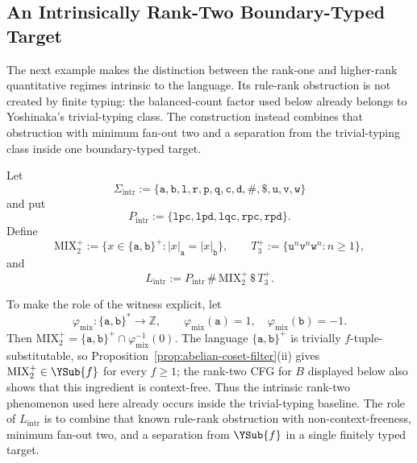 
\subsection{An Intrinsically Rank-Two Boundary-Typed Target}
\label{subsec:intrinsic-ranktwo}

The next example makes the distinction between the rank-one and higher-rank
quantitative regimes intrinsic to the language.  Its rule-rank obstruction is
not created by finite typing: the balanced-count factor used below already
belongs to Yoshinaka's trivial-typing class.  The construction instead combines
that obstruction with minimum fan-out two and a separation from the
trivial-typing class inside one boundary-typed target.

Let
\[
 \Sigma_{\mathrm{intr}}
 :=\{\mathtt a,\mathtt b,\mathtt l,\mathtt r,\mathtt p,\mathtt q,
       \mathtt c,\mathtt d,\mathtt{\#},\mathtt{\$},
       \mathtt u,\mathtt v,\mathtt w\}
\]
and put
\[
 P_{\mathrm{intr}}
 :=\{\mathtt{lpc},\mathtt{lpd},\mathtt{lqc},
       \mathtt{rpc},\mathtt{rpd}\}.
\]
Define
\[
 \mathrm{MIX}_2^+
 :=\{x\in\{\mathtt a,\mathtt b\}^+:
       |x|_{\mathtt a}=|x|_{\mathtt b}\},
 \qquad
 T_3^+
 :=\{\mathtt u^n\mathtt v^n\mathtt w^n:n\ge1\},
\]
and
\[
 L_{\mathrm{intr}}
 :=P_{\mathrm{intr}}\,\mathtt{\#}\,\mathrm{MIX}_2^+\,
   \mathtt{\$}\,T_3^+.
\]

To make the role of the witness explicit, let
\[
 \varphi_{\mathrm{mix}}:\{\mathtt a,\mathtt b\}^*\to\mathbb Z,
 \qquad
 \varphi_{\mathrm{mix}}(\mathtt a)=1,\quad
 \varphi_{\mathrm{mix}}(\mathtt b)=-1.
\]
Then
\(\mathrm{MIX}_2^+ =\{\mathtt a,\mathtt b\}^+\cap\varphi_{\mathrm{mix}}^{-1}(0).\)
The language $\{\mathtt a,\mathtt b\}^+$ is trivially
$f$-tuple-substitutable, so
Proposition~\ref{prop:abelian-coset-filter}(ii) gives
$\mathrm{MIX}_2^+\in\YSub{f}$ for every $f\ge1$; the rank-two CFG for $B$
displayed below also shows that this ingredient is context-free.  Thus the
intrinsic rank-two phenomenon used here already occurs inside the
trivial-typing baseline.  The role of $L_{\mathrm{intr}}$ is to combine that
known rule-rank obstruction with non-context-freeness, minimum fan-out two,
and a separation from $\YSub{f}$ in a single finitely typed target.

